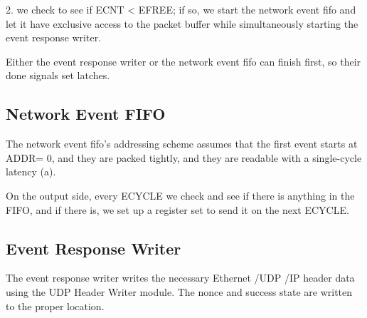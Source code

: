 2. we check to see if ECNT < EFREE; if so, we start the network event fifo and let it have exclusive access to the packet buffer while simultaneously starting the event response writer. 

Either the event response writer or the network event fifo can finish
first, so their done signals set latches.

\subsection{Network Event FIFO}

The network event fifo's addressing scheme assumes that the first
event starts at ADDR= 0, and they are packed tightly, and they are
readable with a single-cycle latency (a).

On the output side, every ECYCLE we check and see if there is anything
in the FIFO, and if there is, we set up a register set to send it on
the next ECYCLE. 

\subsection{Event Response Writer}

The event response writer writes the necessary Ethernet /UDP /IP
header data using the UDP Header Writer module. The nonce and success
state are written to the proper location.

